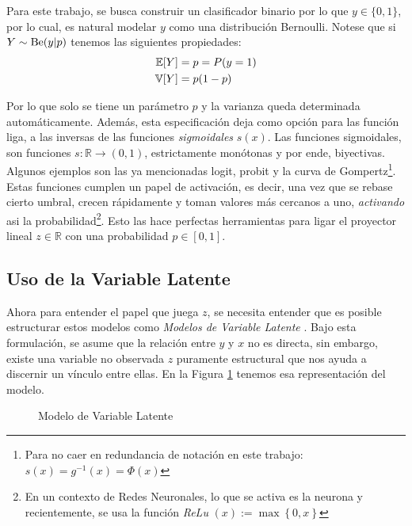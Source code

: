 \documentclass[../Main/Main.tex]{subfiles}
\begin{document}
Para este trabajo, se busca construir un clasificador binario por lo que $y \in \{0,1\}$, por lo cual, es natural modelar $y$ como una distribución Bernoulli. Notese que si $Y \sim \text{Be}(y|p)$ tenemos las siguientes propiedades: 
\begin{align*}
	\mathbb{E}[Y] &= p = P(y = 1) \\
	\mathbb{V}[Y] &= p(1-p)
\end{align*}

Por lo que solo se tiene un parámetro $p$ y la varianza queda determinada automáticamente. Además, esta especificación deja como  opción para las función liga, a las inversas de las funciones \textit{sigmoidales} $s(x)$. Las funciones sigmoidales, son funciones $s:\mathbb{R}\rightarrow (0,1)$, estrictamente monótonas y por ende, biyectivas. Algunos ejemplos son las ya mencionadas logit, probit y la curva de Gompertz\footnote{Para no caer en redundancia de notación en este trabajo: $s(x) = g^{-1}(x) = \Phi(x)$}. Estas funciones cumplen un papel de activación, es decir, una vez que se rebase cierto umbral, crecen rápidamente y toman valores más cercanos a uno, \textit{activando} asi la probabilidad\footnote{En un contexto de Redes Neuronales, lo que se activa es la neurona y recientemente, se usa la función \textit{ReLu} $(x):= \max\left\{0,x\right\}$}. Esto las hace perfectas herramientas para ligar el proyector lineal $z\in\mathbb{R}$ con una probabilidad $p\in[0,1]$.\\

\subsection{Uso de la Variable Latente}

Ahora para entender el papel que juega $z$, se necesita entender que es posible estructurar estos modelos como \textit{Modelos de Variable Latente} \autocite{albert1993bayesian}. Bajo esta formulación, se asume que la relación entre $y$ y $x$ no es directa, sin embargo, existe una variable no observada $z$ puramente estructural que nos ayuda a discernir un vínculo entre ellas. En la Figura \ref{fig:DiagramaVar} tenemos esa  representación del modelo. \\

\begin{figure}[h]
\centering
{}
\caption{Modelo de Variable Latente}
\label{fig:DiagramaVar}
\end{figure}
\end{document}
